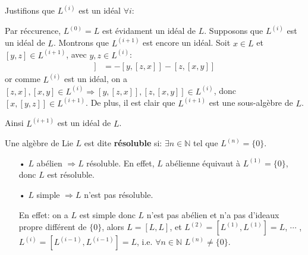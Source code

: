 \documentclass[a4paper,openany,12pt]{report}
\newcommand{\NN}{\mathbb{N}}
\theoremstyle{break}
{\theorembodyfont{\upshape}
\newtheorem*{rmq}{Remarque :}
\newtheorem*{prv}{Preuve :}
\newtheorem*{ex}{Exemples :}
\newtheorem*{exe}{Exemple : }
\newtheorem*{nota}{Notation :}
\newtheorem*{dem}{D\'emonstration :}}
\begin{document}
Justifions que $L^{(i)}$ est un idéal $\forall i$:

\quad Par réccurence, $L^{(0)} = L$ est évidament un idéal de $L$. Supposons que $L^{(i)}$ est un idéal de $L$. Montrons que $L^{(i+1)}$ est encore un idéal. Soit $x \in L$ et $[y,z] \in L^{(i+1)}$, avec $y,z \in L^{(i)}$:
\begin{align*}
[x,[y,z]] & = -[y,[z,x]]-[z,[x,y]]
\end{align*}
or comme $L^{(i)}$ est un idéal, on a $[z,x],[x,y] \in L^{(i)} \Rightarrow [y,[z,x]],[z,[x,y]] \in L^{(i)}$, donc $[x,[y,z]] \in L^{(i+1)}$. De plus, il est clair que $L^{(i+1)}$ est une sous-algèbre de $L$.

Ainsi $L^{(i+1)}$ est un idéal de $L$. 

\begin{df}
\quad Une algèbre de Lie $L$ est dite \textbf{résoluble} si: $\exists n \in \NN $ tel que $L^{(n)} = \{0\}$.
\end{df}

\begin{rmq}
\begin{itemize}
\item[•]  $L$ abélien $\Rightarrow L$ résoluble. En effet, $L$ abélienne équivaut à $L^{(1)} = \{0\}$, donc $L$ est résoluble.

\item[•]  $L$ simple $\Rightarrow L$ n'est pas résoluble.

En effet: on a  $L$ est simple donc $L$ n'est pas  abélien et n'a pas d'ideaux propre différent de $\{0\}$, alors $L = [L,L]$, et $L^{(2)} = [L^{(1)},L^{(1)}] = L$, $\cdots$ , $L^{(i)} = [L^{(i-1)},L^{(i-1)}]=L $, i.e. $\forall n \in \NN $  $L^{(n)}\ne \{0\}$.
\end{itemize}
\end{rmq}
\end{document}
